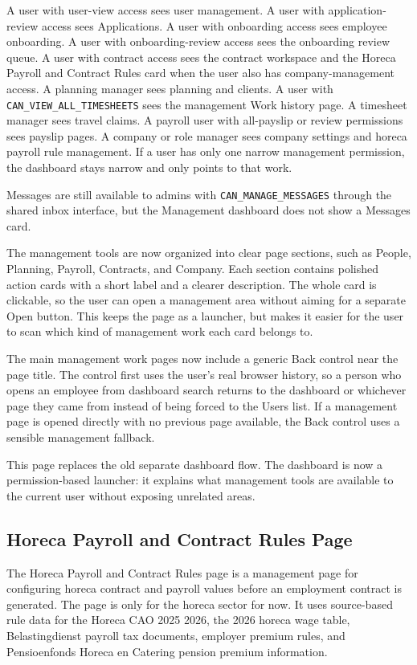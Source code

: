 \documentclass[11pt]{article}
\newcommand{\code}[1]{\nolinkurl{#1}}
\begin{document}
A user with user-view access sees user management. A user with application-review access sees Applications. A user with onboarding access sees employee onboarding. A user with onboarding-review access sees the onboarding review queue. A user with contract access sees the contract workspace and the Horeca Payroll and Contract Rules card when the user also has company-management access. A planning manager sees planning and clients. A user with \code{CAN_VIEW_ALL_TIMESHEETS} sees the management Work history page. A timesheet manager sees travel claims. A payroll user with all-payslip or review permissions sees payslip pages. A company or role manager sees company settings and horeca payroll rule management. If a user has only one narrow management permission, the dashboard stays narrow and only points to that work.

Messages are still available to admins with \code{CAN_MANAGE_MESSAGES} through the shared inbox interface, but the Management dashboard does not show a Messages card.

The management tools are now organized into clear page sections, such as People, Planning, Payroll, Contracts, and Company. Each section contains polished action cards with a short label and a clearer description. The whole card is clickable, so the user can open a management area without aiming for a separate Open button. This keeps the page as a launcher, but makes it easier for the user to scan which kind of management work each card belongs to.

The main management work pages now include a generic Back control near the page title. The control first uses the user's real browser history, so a person who opens an employee from dashboard search returns to the dashboard or whichever page they came from instead of being forced to the Users list. If a management page is opened directly with no previous page available, the Back control uses a sensible management fallback.

This page replaces the old separate dashboard flow. The dashboard is now a permission-based launcher: it explains what management tools are available to the current user without exposing unrelated areas.
\subsection{Horeca Payroll and Contract Rules Page}

The Horeca Payroll and Contract Rules page is a management page for configuring horeca contract and payroll values before an employment contract is generated. The page is only for the horeca sector for now. It uses source-based rule data for the Horeca CAO 2025 2026, the 2026 horeca wage table, Belastingdienst payroll tax documents, employer premium rules, and Pensioenfonds Horeca en Catering pension premium information.
\end{document}
